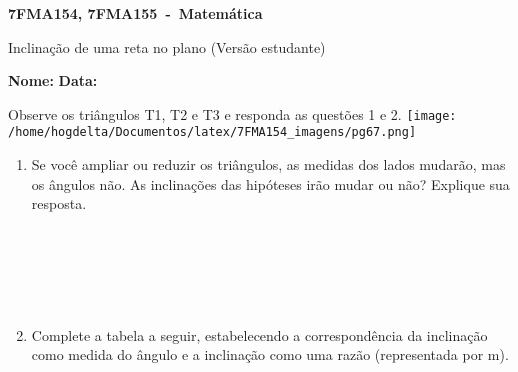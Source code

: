 \documentclass[a4paper,14pt]{article}
\begin{document}
	
	\noindent\textbf{7FMA154, 7FMA155~-~Matemática} 
	
	\begin{center}Inclinação de uma reta no plano (Versão estudante)
	\end{center}
	
	
	\noindent\textbf{Nome:} \underline{\hspace{10cm}}
    \noindent\textbf{Data:} \underline{\hspace{4cm}}
	
	
	\begin{multicols}{2}
		Observe os triângulos T1, T2 e T3 e responda as questões 1 e 2.
		\texttt{[image: /home/hogdelta/Documentos/latex/7FMA154\_imagens/pg67.png]}
	    \begin{enumerate}
	    	\item Se você ampliar ou reduzir os triângulos, as medidas dos lados mudarão, mas os ângulos não. As inclinações das hipóteses irão mudar ou não? Explique sua resposta.
	    	\\\\\\\\\\\\
	        
	    	\item Complete a tabela a seguir, estabelecendo a correspondência da inclinação como medida do ângulo e a inclinação como uma razão (representada por m). \\\\
		    
		    \begin{center}	
		    	

\end{center}
\end{enumerate}
\end{multicols}
\end{document}
